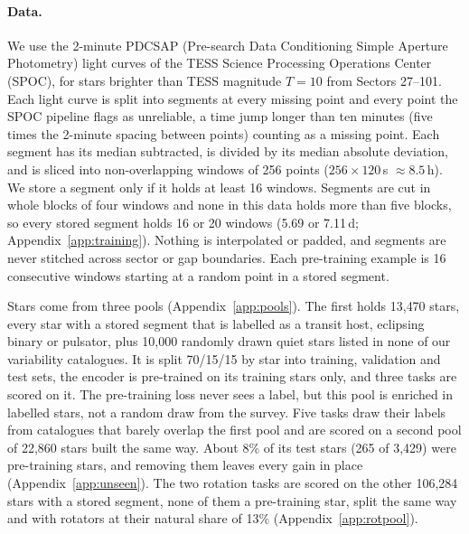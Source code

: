 \documentclass{article}
\begin{document}
\paragraph{Data.} We use the 2-minute PDCSAP (Pre-search Data Conditioning Simple Aperture
Photometry) light curves of the TESS Science Processing Operations Center (SPOC), for stars brighter than TESS magnitude
$T = 10$ from Sectors 27--101. Each light curve is split into segments at every missing point
and every point the SPOC pipeline flags as unreliable, a time jump longer than ten minutes (five
times the 2-minute spacing between points) counting as a missing point. Each segment has its median subtracted, is divided by
its median absolute deviation, and is sliced into non-overlapping windows of 256 points ($256 \times 120$\,s $\approx 8.5$\,h). We store a segment only if it holds
at least 16 windows. Segments are cut in whole blocks of four windows and none in this data holds
more than five blocks, so every stored segment holds 16 or 20 windows (5.69 or 7.11\,d;
Appendix~\ref{app:training}). Nothing is interpolated or padded, and segments are never stitched
across sector or gap boundaries. Each pre-training example is 16 consecutive windows starting at a
random point in a stored segment.

Stars come from three pools (Appendix~\ref{app:pools}). The first holds 13{,}470 stars, every star
with a stored segment that is labelled as a transit host, eclipsing binary or pulsator, plus
10{,}000 randomly drawn quiet stars listed in none of our variability catalogues. It is split
70/15/15 by star into training, validation and test sets, the encoder is pre-trained on its training
stars only, and three tasks are scored on it. The pre-training loss never sees a label, but this pool
is enriched in labelled stars, not a random draw from the survey. Five tasks draw their labels from
catalogues that barely overlap the first pool and are scored on a second pool of 22{,}860 stars built
the same way. About 8\% of its test stars (265 of 3{,}429) were pre-training stars, and removing them
leaves every gain in place (Appendix~\ref{app:unseen}). The two rotation tasks are scored on the
other 106{,}284 stars with a stored segment, none of them a pre-training star, split the same way and
with rotators at their natural share of 13\% (Appendix~\ref{app:rotpool}).
\end{document}
